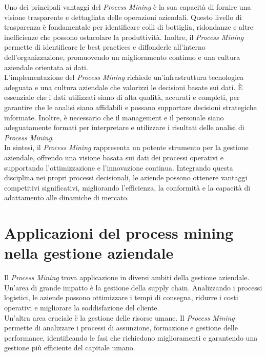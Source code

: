 \documentclass{article}
\begin{document}
Uno dei principali vantaggi del \textit{Process Mining} è la sua capacità di fornire una visione trasparente e dettagliata delle operazioni aziendali. Questo livello di trasparenza è fondamentale per identificare colli di bottiglia, ridondanze e altre inefficienze che possono ostacolare la produttività. Inoltre, il \textit{Process Mining} permette di identificare le best practices e diffonderle all'interno dell'organizzazione, promuovendo un miglioramento continuo e una cultura aziendale orientata ai dati.\\

L'implementazione del \textit{Process Mining} richiede un'infrastruttura tecnologica adeguata e una cultura aziendale che valorizzi le decisioni basate sui dati. È essenziale che i dati utilizzati siano di alta qualità, accurati e completi, per garantire che le analisi siano affidabili e possano supportare decisioni strategiche informate. Inoltre, è necessario che il management e il personale siano adeguatamente formati per interpretare e utilizzare i risultati delle analisi di \textit{Process Mining}.\\

In sintesi, il \textit{Process Mining} rappresenta un potente strumento per la gestione aziendale, offrendo una visione basata sui dati dei processi operativi e supportando l'ottimizzazione e l'innovazione continua. Integrando questa disciplina nei propri processi decisionali, le aziende possono ottenere vantaggi competitivi significativi, migliorando l'efficienza, la conformità e la capacità di adattamento alle dinamiche di mercato.\\

\section{Applicazioni del process mining nella gestione aziendale}
Il \textit{Process Mining} trova applicazione in diversi ambiti della gestione aziendale. Un'area di grande impatto è la gestione della supply chain. Analizzando i processi logistici, le aziende possono ottimizzare i tempi di consegna, ridurre i costi operativi e migliorare la soddisfazione del cliente.\\

Un'altra area cruciale è la gestione delle risorse umane. Il \textit{Process Mining} permette di analizzare i processi di assunzione, formazione e gestione delle performance, identificando le fasi che richiedono miglioramenti e garantendo una gestione più efficiente del capitale umano.\\
\end{document}
